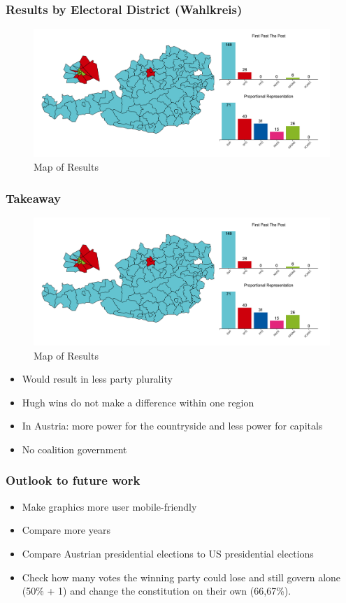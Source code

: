 \documentclass{beamer}
\begin{document}
\begin{frame}
\frametitle{Results by Electoral District (Wahlkreis)}
\begin{figure}[h]
  \centering
  \includegraphics[width=0.9\linewidth]{../Screenshot/mapbywahlbezirken.png}
  \caption{\label{fig:mapOfResults} Map of Results}
\end{figure}
\end{frame}

\begin{frame}
\frametitle{Takeaway}
\begin{figure}[h]
  \centering
  \includegraphics[width=0.9\linewidth]{../Screenshot/mapbywahlbezirken.png}
  \caption{\label{fig:mapOfResults} Map of Results}
\end{figure}
\begin{itemize}
\item Would result in less party plurality 
\item Hugh wins do not make a difference within one region
\item In Austria: more power for the countryside and less power for capitals
\item No coalition government 
\end{itemize}
\end{frame}


\begin{frame}
\frametitle{Outlook to future work}
\begin{itemize}
\item Make graphics more user mobile-friendly 
\item Compare more years
\item Compare Austrian presidential elections to US presidential elections
\item Check how many votes the winning party could lose and still govern alone (50\% + 1) and change the constitution on their own (66,67\%).
\end{itemize}
\end{frame}
\end{document}
